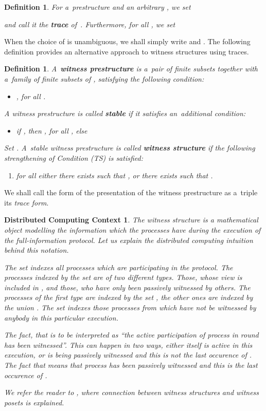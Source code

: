 \documentclass{amsart}[10pt]
\newtheorem{df}[theorem]{Definition}
\newtheorem{dcc}[theorem]{Distributed Computing Context}
\numberwithin{equation}{section}
\numberwithin{figure}{section}
\numberwithin{table}{section}
\begin{document}
\begin{df}\label{df:trc}
For a~prestructure  and an arbitrary , we set
 
and call it the {\bf trace} of~. Furthermore, for all
, we set 

\end{df}

\nin When the choice of  is unambiguous, we shall simply write
 and . The following definition provides an
alternative approach to witness structures using traces.

\begin{df}\label{df:trws}
A~{\bf witness prestructure} is a~pair of finite subsets
 together with a~family  of finite subsets of , satisfying the following
condition:
\begin{itemize}
\item[(T)] , for all .
\end{itemize}

\noindent
A witness prestructure is called {\bf stable} if it satisfies
an~additional condition:
\begin{itemize}
\item[(TS)] if , then , for all ,
else 

\end{itemize}

Set . A~stable witness prestructure is
called {\bf witness structure} if the following strengthening of
Condition (TS) is satisfied:
\begin{enumerate}
\item[(TW)] {\it for all  either there exists 
  such that , or there exists  such that
  .}
\end{enumerate}
\end{df}

We shall call the form of the presentation of the witness prestructure
as a~triple  its {\it trace form}.

\begin{dcc}
The witness structure is a mathematical object modelling the
information which the processes have during the execution of the
full-information protocol. Let us explain the distributed computing
intuition behind this notation.

The set  indexes all processes which are participating in
the protocol. The processes indexed by the set  are of two
different types.  Those, whose view is included in , and
those, who have only been passively witnessed by others. The processes
of the first type are indexed by the set , the other ones
are indexed by the union . The set  indexes
those processes from  which have not be witnessed by
anybody in this particular execution.

The fact, that  is to be interpreted as ``the active
participation of process  in round  has been witnessed''. This
can happen in two ways, either  itself is active in this execution,
or  is being passively witnessed and this is not the last occurence
of . The fact that  means that process  has been
passively witnessed and this is the last occurence of . 

We refer the reader to \cite[Section 6]{k1}, where connection between
witness structures and witness posets is explained.
\end{dcc}
\end{document}
